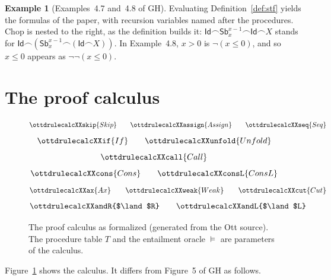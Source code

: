 \documentclass[11pt]{article}
\newcommand{\chop}{\smallfrown}
\newcommand{\Id}{\mathsf{Id}}
\newcommand{\Sb}[2]{\mathsf{Sb}^{#1}_{#2}}
\newcommand{\GH}[1]{#1 of GH}
\theoremstyle{plain}
\theoremstyle{definition}
\newtheorem{example}[theorem]{Example}
\theoremstyle{remark}
\begin{document}
\begin{example}[\GH{Examples~4.7 and~4.8}]\label{ex:stf}
  Evaluating Definition~\ref{def:stf} yields the formulas of the paper,
  with recursion variables named after the procedures. Chop is nested to the
  right, as the definition builds it: $\Id\chop\Sb{x-1}{x}\chop\Id\chop X$
  stands for $\Id\chop(\Sb{x-1}{x}\chop(\Id\chop X))$. In Example~4.8,
  $x > 0$ is $\lnot(x \leq 0)$, and so $x \leq 0$ appears as
  $\lnot\lnot(x \leq 0)$.
\end{example}

\section{The proof calculus}\label{sec:calculus}

\begin{figure}[t]
  \small
  \[
    \ottdrulecalcXXskip{Skip} \qquad
    \ottdrulecalcXXassign{Assign} \qquad
    \ottdrulecalcXXseq{Seq}
  \]
  \[
    \ottdrulecalcXXif{If} \qquad
    \ottdrulecalcXXunfold{Unfold}
  \]
  \[
    \ottdrulecalcXXcall{Call}
  \]
  \[
    \ottdrulecalcXXcons{Cons} \qquad
    \ottdrulecalcXXconsL{ConsL}
  \]
  \[
    \ottdrulecalcXXax{Ax} \qquad
    \ottdrulecalcXXweak{Weak} \qquad
    \ottdrulecalcXXcut{Cut}
  \]
  \[
    \ottdrulecalcXXandR{$\land$R} \qquad
    \ottdrulecalcXXandL{$\land$L}
  \]
  \caption{The proof calculus as formalized (generated from the Ott
    source). The procedure table $T$ and the entailment oracle $\models$
    are parameters of the calculus.}
  \label{fig:calculus}
\end{figure}

Figure~\ref{fig:calculus} shows the calculus. It differs from
\GH{Figure~5} as follows.
\end{document}
